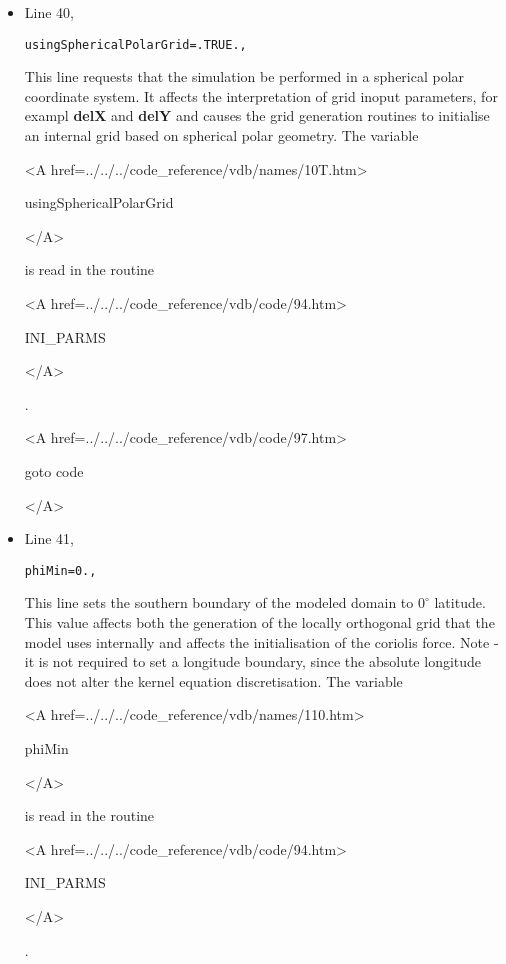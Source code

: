 \begin{itemize}
\item Line 40,
\begin{verbatim}
usingSphericalPolarGrid=.TRUE.,
\end{verbatim}
This line requests that the simulation be performed in a 
spherical polar coordinate system. It affects the interpretation of
grid inoput parameters, for exampl {\bf delX} and {\bf delY} and
causes the grid generation routines to initialise an internal grid based
on spherical polar geometry.
The variable
{\bf
\begin{rawhtml} <A href=../../../code_reference/vdb/names/10T.htm> \end{rawhtml}
usingSphericalPolarGrid
\begin{rawhtml} </A>\end{rawhtml}
}
is read in the routine
{\it
\begin{rawhtml} <A href=../../../code_reference/vdb/code/94.htm> \end{rawhtml}
INI\_PARMS
\begin{rawhtml} </A>\end{rawhtml}
}.

{\bf
\begin{rawhtml} <A href=../../../code_reference/vdb/code/97.htm> \end{rawhtml}
goto code
\begin{rawhtml} </A>\end{rawhtml}
}

\item Line 41,
\begin{verbatim}
phiMin=0.,
\end{verbatim}
This line sets the southern boundary of the modeled
domain to $0^{\circ}$ latitude. This value affects both the
generation of the locally orthogonal grid that the model
uses internally and affects the initialisation of the coriolis force.
Note - it is not required to set
a longitude boundary, since the absolute longitude does
not alter the kernel equation discretisation.
The variable
{\bf
\begin{rawhtml} <A href=../../../code_reference/vdb/names/110.htm> \end{rawhtml}
phiMin
\begin{rawhtml} </A>\end{rawhtml}
}
is read in the routine
{\it
\begin{rawhtml} <A href=../../../code_reference/vdb/code/94.htm> \end{rawhtml}
INI\_PARMS
\begin{rawhtml} </A>\end{rawhtml}
}.


\end{itemize}
